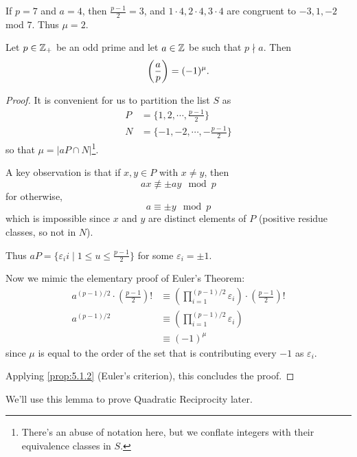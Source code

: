 \begin{example}
    If $p=7$ and $a=4$, then $\frac{p-1}{2} = 3$, and
    $1\cdot 4, 2\cdot 4, 3\cdot 4$ are congruent to $-3, 1, -2$ mod $7$. Thus $\mu = 2$.
\end{example}
\begin{lemma}\label{lemma:gauss-lemma}
    Let $p\in\mathbb Z_+$ be an odd prime and let $a\in\mathbb Z$ be such that $p\nmid a$. Then
    \[\left(\dfrac{a}{p}\right) = (-1)^\mu.\]
\end{lemma}
\begin{proof}
    It is convenient for us to partition the list $S$ as
    \begin{align*}
        P & = \{1, 2, \cdots, \frac{p-1}{2}\}    \\
        N & = \{-1, -2, \cdots, -\frac{p-1}{2}\}
    \end{align*}
    so that $\mu = |aP\cap N|$\footnote{There's an abuse of notation here, but we conflate integers with their equivalence classes in $S$.}.

    A key observation is that if $x, y\in P$ with $x\neq y$, then
    \[ax\not\equiv \pm ay\mod p\]
    for otherwise,
    \[a \equiv \pm y\mod p\]
    which is impossible since $x$ and $y$ are distinct elements of $P$ (positive residue classes, so not in $N$).

    Thus $aP = \{\varepsilon_i i\mid 1\leq u\leq \frac{p-1}{2}\}$ for some $\varepsilon_i = \pm 1$.

    Now we mimic the elementary proof of Euler's Theorem:
    \begin{align*}
        a^{(p-1)/2}\cdot \left(\frac{p-1}{2}\right)! & \equiv \left(\prod_{i=1}^{(p-1)/2} \varepsilon_i\right)\cdot \left(\frac{p-1}{2}\right)! \\
        a^{(p-1)/2}                                  & \equiv \left(\prod_{i=1}^{(p-1)/2} \varepsilon_i\right)                                  \\
                                                     & \equiv (-1)^\mu
    \end{align*}
    since $\mu$ is equal to the order of the set that is contributing every $-1$ as $\varepsilon_i$.

    Applying \cref{prop:5.1.2} (Euler's criterion), this concludes the proof.
\end{proof}
We'll use this lemma to prove Quadratic Reciprocity later.

